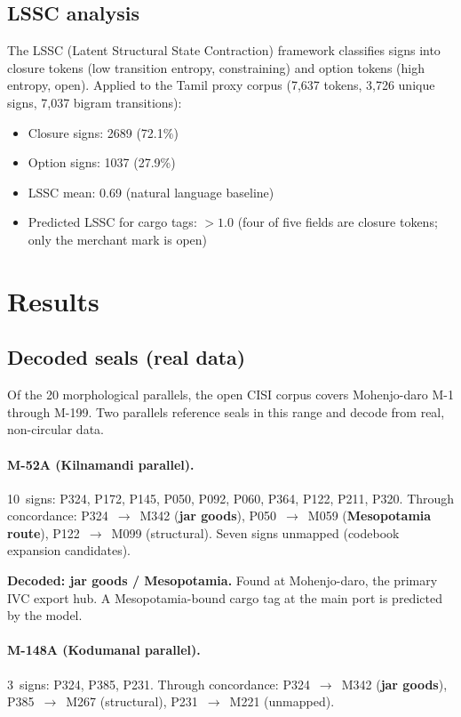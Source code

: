 \subsection{LSSC analysis}

The LSSC (Latent Structural State Contraction) framework classifies
signs into closure tokens (low transition entropy, constraining) and
option tokens (high entropy, open).
Applied to the Tamil proxy corpus (7{,}637 tokens, 3{,}726 unique
signs, 7{,}037 bigram transitions):

\begin{itemize}
\item Closure signs: \num{2689} (72.1\%)
\item Option signs: \num{1037} (27.9\%)
\item LSSC mean: 0.69 (natural language baseline)
\item Predicted LSSC for cargo tags: $>1.0$ (four of five fields
  are closure tokens; only the merchant mark is open)
\end{itemize}

\section{Results}

\subsection{Decoded seals (real data)}

Of the 20 morphological parallels, the open CISI corpus covers
Mohenjo-daro M-1 through M-199.
Two parallels reference seals in this range and decode from real,
non-circular data.

\paragraph{M-52A (Kilnamandi parallel).}
10~signs: P324, P172, P145, P050, P092, P060, P364, P122, P211,
P320.
Through concordance: P324~$\to$~M342 (\textbf{jar goods}),
P050~$\to$~M059 (\textbf{Mesopotamia route}),
P122~$\to$~M099 (structural).
Seven signs unmapped (codebook expansion candidates).

\textbf{Decoded: jar goods / Mesopotamia.}
Found at Mohenjo-daro, the primary IVC export hub.
A Mesopotamia-bound cargo tag at the main port is predicted by the
model.

\paragraph{M-148A (Kodumanal parallel).}
3~signs: P324, P385, P231.
Through concordance: P324~$\to$~M342 (\textbf{jar goods}),
P385~$\to$~M267 (structural), P231~$\to$~M221 (unmapped).

